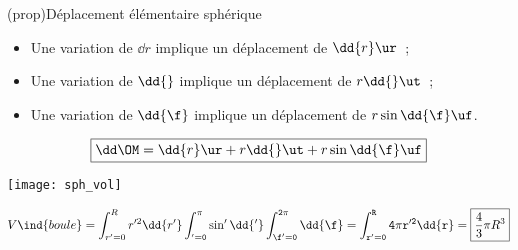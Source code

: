 \documentclass[../../main/main.tex]{subfiles}
\begin{document}
\begin{tcb*}(prop){Déplacement élémentaire sphérique}
	\begin{minipage}{0.70\linewidth}
		\begin{itemize}
			\item Une variation de $\dd{r}$ implique un déplacement de $\dd{r}\ur$~;
			\item Une variation de $\dd{\tt}$ implique un déplacement de
			      $r\dd{\tt}\ut$~;
			\item Une variation de $\dd{\f}$ implique un déplacement de
			      $r\sin\tt\dd{\f}\uf$.
		\end{itemize} \bigbreak
		\[\boxed{\dd\OM = \dd{r}\ur + r\dd{\tt}\ut + r\sin\tt\dd{\f}\uf}\]
	\end{minipage}
	\hfill
	\begin{minipage}{0.29\linewidth}
		\begin{center}
			\texttt{[image: sph\_vol]}
		\end{center}
	\end{minipage}
\end{tcb*}

\[V\ind{boule}
	= \int_{r'=0}^{R} r'^2\dd{r'}
	\int_{\tt' = 0}^{\pi} \sin\tt'\dd{\tt'}
	\int_{\f'=0}^{2\pi} \dd{\f}
	= \int_{r'=0}^{R} 4\pi r'^2 \dd{r}
	= \boxed{\frac{4}{3}\pi R^3}
\]
\end{document}
